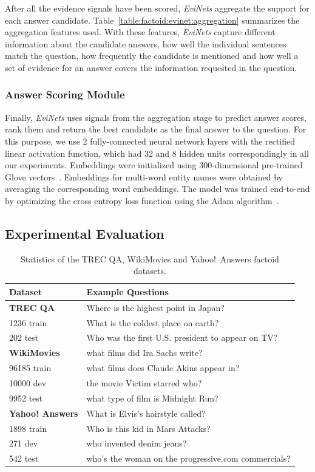 After all the evidence signals have been scored, \textit{EviNets} aggregate the support for each answer candidate.
Table~\ref{table:factoid:evinet:aggregation} summarizes the aggregation features used.
With these features, \textit{EviNets} capture different information about the candidate answers, \ie how well the individual sentences match the question, how frequently the candidate is mentioned and how well a set of evidence for an answer covers the information requested in the question.

\subsubsection{Answer Scoring Module}

Finally, \textit{EviNets} uses signals from the aggregation stage to predict answer scores, rank them and return the best candidate as the final answer to the question.
For this purpose, we use 2 fully-connected neural network layers with the rectified linear activation function, which had 32 and 8 hidden units correspondingly in all our experiments.
Embeddings were initialized using 300-dimensional pre-trained Glove vectors~\cite{pennington2014glove}.
Embeddings for multi-word entity names were obtained by averaging the corresponding word embeddings.
The model was trained end-to-end by optimizing the cross entropy loss function using the Adam algorithm~\cite{kingma2014adam}.

\subsection{Experimental Evaluation}
\label{section:factoid:evinet:eval}

\begin{table}
\small
\centering
\begin{tabular}{lp{9cm}}
Dataset & Example Questions \\
\hline
\textbf{TREC QA} & Where is the highest point in Japan? \\
1236 train & What is the coldest place on earth? \\
202 test & Who was the first U.S. president to appear on TV?\\
\hline
\textbf{WikiMovies} & what films did Ira Sachs write? \\
96185 train & what films does Claude Akins appear in? \\
10000 dev & the movie Victim starred who? \\
9952 test & what type of film is Midnight Run? \\
\hline
\textbf{Yahoo! Answers} & What is Elvis's hairstyle called? \\
1898 train & Who is this kid in Mars Attacks? \\
271 dev & who invented denim jeans? \\
542 test & who's the woman on the progressive.com commercials? \\
\end{tabular}
\caption{Statistics of the TREC QA, WikiMovies and Yahoo!~Answers factoid datasets.}
\label{table:factoid:evinet:datasets}
\end{table}



